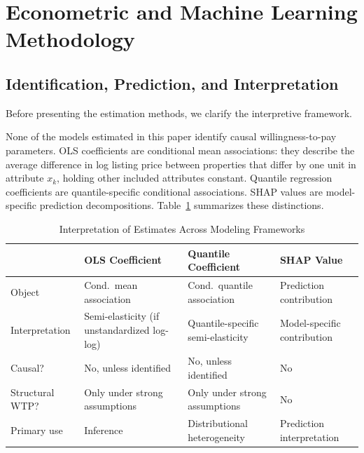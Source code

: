 %
\section{Econometric and Machine Learning Methodology}
\label{sec:methodology}

\subsection{Identification, Prediction, and Interpretation}
\label{sec:identification}

Before presenting the estimation methods, we clarify the interpretive framework.

None of the models estimated in this paper identify causal willingness-to-pay parameters. OLS coefficients are conditional mean associations: they describe the average difference in log listing price between properties that differ by one unit in attribute $x_k$, holding other included attributes constant. Quantile regression coefficients are quantile-specific conditional associations. SHAP values are model-specific prediction decompositions. Table~\ref{tab:interpretation} summarizes these distinctions.

\begin{table}[H]
\centering
\caption{Interpretation of Estimates Across Modeling Frameworks}
\label{tab:interpretation}
\small
\begin{tabular}{lp{3.2cm}p{3.2cm}p{3.5cm}}
\toprule
& OLS Coefficient & Quantile Coefficient & SHAP Value \\
\midrule
Object & Cond.\ mean association & Cond.\ quantile association & Prediction contribution \\
Interpretation & Semi-elasticity (if unstandardized log-log) & Quantile-specific semi-elasticity & Model-specific contribution \\
Causal? & No, unless identified & No, unless identified & No \\
Structural WTP? & Only under strong assumptions & Only under strong assumptions & No \\
Primary use & Inference & Distributional heterogeneity & Prediction interpretation \\
\bottomrule
\end{tabular}
\end{table}

